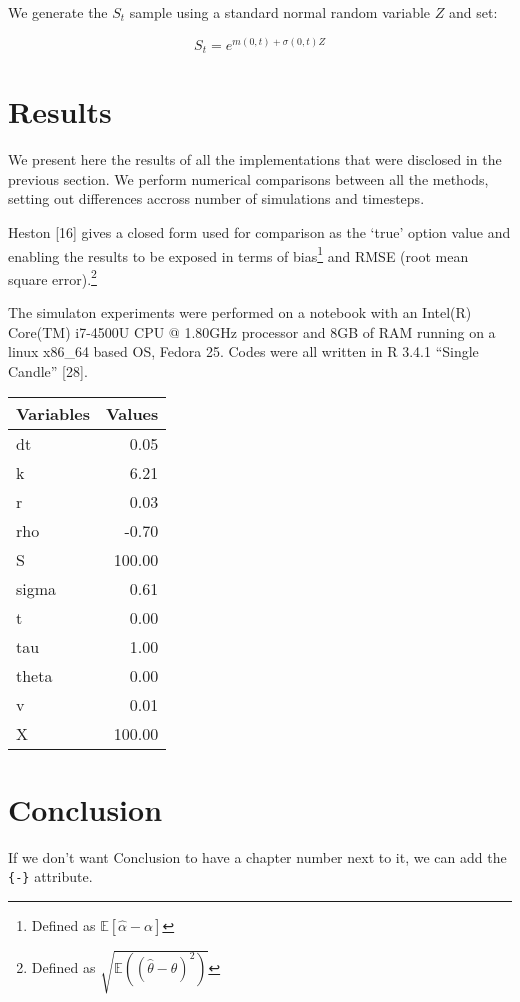 \documentclass[12pt,twoside]{reedthesis}
\theoremstyle{definition}
\theoremstyle{definition}
\theoremstyle{remark}
\begin{document}
  We generate the \(S_t\) sample using a standard normal random variable
  \(Z\) and set:
  
  \[S_t = e^{m(0,t) + \sigma (0,t) Z}\]
  
  \chapter{Results}\label{results}
  
  We present here the results of all the implementations that were
  disclosed in the previous section. We perform numerical comparisons
  between all the methods, setting out differences accross number of
  simulations and timesteps.
  
  Heston {[}16{]} gives a closed form used for comparison as the `true'
  option value and enabling the results to be exposed in terms of
  bias\footnote{Defined as
    \(\mathbb{E} \left[ \hat{\alpha} - \alpha \right]\)} and RMSE (root
  mean square error).\footnote{Defined as
    \(\sqrt{\mathbb{E}((\hat{\theta}-\theta)^2)}\)}
  
  The simulaton experiments were performed on a notebook with an Intel(R)
  Core(TM) i7-4500U CPU @ 1.80GHz processor and 8GB of RAM running on a
  linux x86\_64 based OS, Fedora 25. Codes were all written in R 3.4.1
  ``Single Candle'' {[}28{]}.
  
  \clearpage
  \begin{tabular}{l|r}
  \hline
  Variables & Values\\
  \hline
  dt & 0.05\\
  \hline
  k & 6.21\\
  \hline
  r & 0.03\\
  \hline
  rho & -0.70\\
  \hline
  S & 100.00\\
  \hline
  sigma & 0.61\\
  \hline
  t & 0.00\\
  \hline
  tau & 1.00\\
  \hline
  theta & 0.00\\
  \hline
  v & 0.01\\
  \hline
  X & 100.00\\
  \hline
  \end{tabular}
  \chapter{Conclusion}\label{conclusion}
  
  If we don't want Conclusion to have a chapter number next to it, we can
  add the \texttt{\{-\}} attribute.
  
\end{document}
